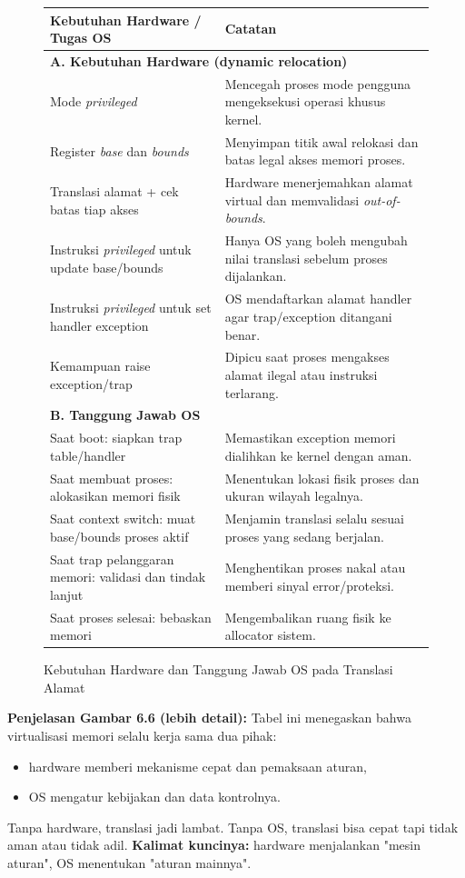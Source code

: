 \begin{figure}[!htbp]
\centering
\scriptsize
\begin{tabular}{|p{}|p{}|}
\hline
\textbf{Kebutuhan Hardware / Tugas OS} & \textbf{Catatan} \\
\hline
\multicolumn{2}{|l|}{\textbf{A. Kebutuhan Hardware (dynamic relocation)}} \\
\hline
Mode \textit{privileged} & Mencegah proses mode pengguna mengeksekusi operasi khusus kernel. \\
\hline
Register \textit{base} dan \textit{bounds} & Menyimpan titik awal relokasi dan batas legal akses memori proses. \\
\hline
Translasi alamat + cek batas tiap akses & Hardware menerjemahkan alamat virtual dan memvalidasi \textit{out-of-bounds}. \\
\hline
Instruksi \textit{privileged} untuk update base/bounds & Hanya OS yang boleh mengubah nilai translasi sebelum proses dijalankan. \\
\hline
Instruksi \textit{privileged} untuk set handler exception & OS mendaftarkan alamat handler agar trap/exception ditangani benar. \\
\hline
Kemampuan raise exception/trap & Dipicu saat proses mengakses alamat ilegal atau instruksi terlarang. \\
\hline
\multicolumn{2}{|l|}{\textbf{B. Tanggung Jawab OS}} \\
\hline
Saat boot: siapkan trap table/handler & Memastikan exception memori dialihkan ke kernel dengan aman. \\
\hline
Saat membuat proses: alokasikan memori fisik & Menentukan lokasi fisik proses dan ukuran wilayah legalnya. \\
\hline
Saat context switch: muat base/bounds proses aktif & Menjamin translasi selalu sesuai proses yang sedang berjalan. \\
\hline
Saat trap pelanggaran memori: validasi dan tindak lanjut & Menghentikan proses nakal atau memberi sinyal error/proteksi. \\
\hline
Saat proses selesai: bebaskan memori & Mengembalikan ruang fisik ke allocator sistem. \\
\hline
\end{tabular}
\caption{Kebutuhan Hardware dan Tanggung Jawab OS pada Translasi Alamat}
\label{fig:vmmech-hwos}
\end{figure}

\textbf{Penjelasan Gambar 6.6 (lebih detail):}
Tabel ini menegaskan bahwa virtualisasi memori selalu kerja sama dua pihak:
\begin{itemize}
    \item hardware memberi mekanisme cepat dan pemaksaan aturan,
    \item OS mengatur kebijakan dan data kontrolnya.
\end{itemize}
Tanpa hardware, translasi jadi lambat. Tanpa OS, translasi bisa cepat tapi tidak aman atau tidak adil.
\textbf{Kalimat kuncinya:} hardware menjalankan "mesin aturan", OS menentukan "aturan mainnya".
\FloatBarrier

